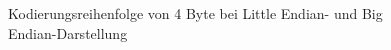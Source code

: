 \begin{figure}[htbp]
  \vspace{0.5cm}
  \centering
  \caption{Kodierungsreihenfolge von 4 Byte bei Little Endian- und Big Endian-Darstellung}
  \label{byteorder}
  \vspace{0.5cm}
\end{figure}

